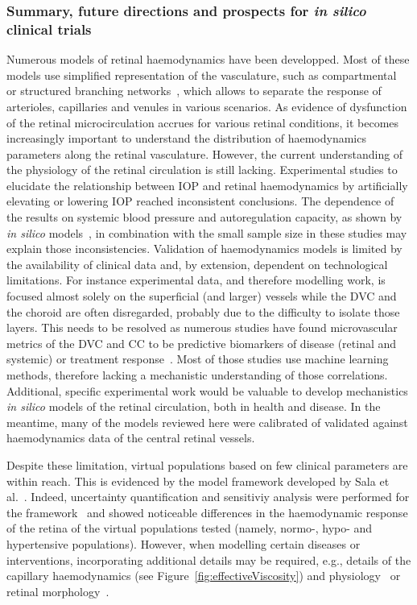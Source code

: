 \documentclass{article}
\begin{document}
\subsubsection{Summary, future directions and prospects for \textit{in silico} clinical trials}
Numerous models of retinal haemodynamics have been developped.
Most of these models use simplified representation of the vasculature, such as compartmental~\cite{Chiaravalli_2021,Guidoboni_2014a,Fawzi_2019,Nelson_2017,Petersen_2022} or structured branching networks~\cite{Arciero_2008,Arciero_2013, Takahashi_2009,Pappelis_2020}, which allows to separate the response of arterioles, capillaries and venules in various scenarios. 
As evidence of dysfunction of the retinal microcirculation accrues for various retinal conditions, it becomes increasingly important to understand the distribution of haemodynamics parameters along the retinal vasculature.
However, the current understanding of the physiology of the retinal circulation is still lacking.
Experimental studies to elucidate the relationship between IOP and retinal haemodynamics by artificially elevating or lowering IOP reached inconsistent conclusions\cite{Conway_2010,Findl_1997}.
The dependence of the results on systemic blood pressure and autoregulation capacity, as shown by \textit{in silico} models~\cite{Arciero_2008,Arciero_2013,Guidoboni_2014a}, in combination with the small sample size in these studies may explain those inconsistencies.
Validation of haemodynamics models is limited by the availability of clinical data and, by extension, dependent on technological limitations.
For instance experimental data, and therefore modelling work, is focused almost solely on the superficial (and larger) vessels while the DVC and the choroid are often disregarded, probably due to the difficulty to isolate those layers.
This needs to be resolved as numerous studies have found microvascular metrics of the DVC and CC to be predictive biomarkers of disease (retinal and systemic) or treatment response~\cite{Kashani_2017}.
Most of those studies use machine learning methods, therefore lacking a mechanistic understanding of those correlations.
Additional, specific experimental work would be valuable to develop mechanistics \textit{in silico} models of the retinal circulation, both in health and disease.
In the meantime, many of the models reviewed here were calibrated of validated against haemodynamics data of the central retinal vessels.

Despite these limitation, virtual populations based on few clinical parameters are within reach.
This is evidenced by the model framework developed by Sala et al.~\cite{Sala_2018,Sala_2020}.
Indeed, uncertainty quantification and sensitiviy analysis were performed for the framework~\cite{Prudhomme_2021} and showed noticeable differences in the haemodynamic response of the retina of the virtual populations tested (namely, normo-, hypo- and hypertensive populations).
However, when modelling certain diseases or interventions, incorporating additional details may be required, e.g., details of the capillary haemodynamics (see Figure~\ref{fig:effectiveViscosity}) and physiology~\cite{Causin_2015,Gast_2016} or retinal morphology~\cite{Dziubek_2015,Rebhan_2019}.
\end{document}
